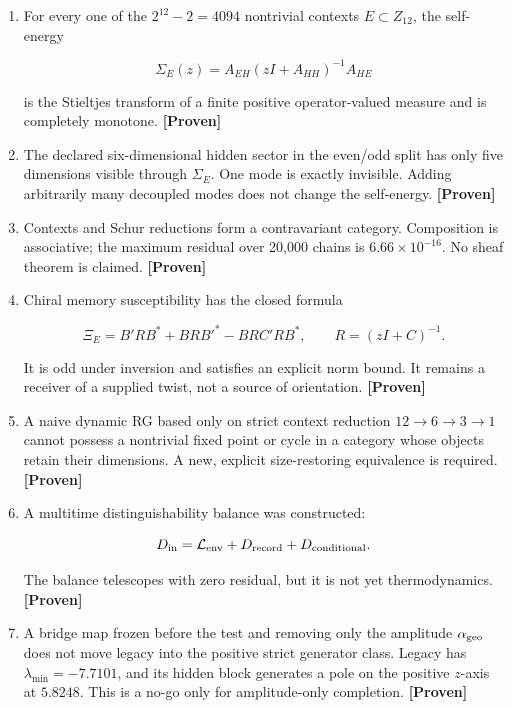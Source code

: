 \documentclass[11pt,a4paper,openany]{report}
\newcommand{\statusProven}{\textcolor{fingreen}{[Proven]}}
\begin{document}
\begin{enumerate}
\item 
For every one of the \(2^{12}-2=4094\) nontrivial contexts \(E\subset Z_{12}\), the self-energy

\[
   \Sigma_E(z)=A_{EH}(zI+A_{HH})^{-1}A_{HE}
   \]

is the Stieltjes transform of a finite positive operator-valued measure and is completely monotone. \textbf{\statusProven{}}

\item 
The declared six-dimensional hidden sector in the even/\allowbreak{}odd split has only five dimensions visible through \(\Sigma_E\). One mode is exactly invisible. Adding arbitrarily many decoupled modes does not change the self-energy. \textbf{\statusProven{}}

\item 
Contexts and Schur reductions form a contravariant category. Composition is associative; the maximum residual over 20,000 chains is \(6.66\times10^{-16}\). No sheaf theorem is claimed. \textbf{\statusProven{}}

\item 
Chiral memory susceptibility has the closed formula

\[
   \Xi_E=B'RB^\ast+BRB'^\ast-BRC'RB^\ast,
   \qquad R=(zI+C)^{-1}.
   \]

It is odd under inversion and satisfies an explicit norm bound. It remains a receiver of a supplied twist, not a source of orientation. \textbf{\statusProven{}}

\item 
A naive dynamic RG based only on strict context reduction \(12\to6\to3\to1\) cannot possess a nontrivial fixed point or cycle in a category whose objects retain their dimensions. A new, explicit size-restoring equivalence is required. \textbf{\statusProven{}}

\item 
A multitime distinguishability balance was constructed:

\[
   D_{\rm in}
   =
   \mathcal L_{\rm env}
   +D_{\rm record}
   +D_{\rm conditional}.
   \]

The balance telescopes with zero residual, but it is not yet thermodynamics. \textbf{\statusProven{}}

\item 
A bridge map frozen before the test and removing only the amplitude \(\alpha_{\rm geo}\) does not move legacy into the positive strict generator class. Legacy has \(\lambda_{\min}=-7.7101\), and its hidden block generates a pole on the positive \(z\)-axis at \(5.8248\). This is a no-go only for amplitude-only completion. \textbf{\statusProven{}}


\end{enumerate}
\end{document}
